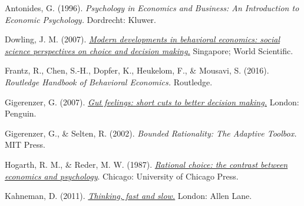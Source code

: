 \documentclass[
  x11names]{article}
\begin{document}
\noindent \vspace{-2em} \setlength{\parindent}{-0.5in}
\setlength{\leftskip}{0.5in} \setlength{\parskip}{7.5pt}

Antonides, G. (1996). \emph{Psychology in Economics and Business: An
Introduction to Economic Psychology.} Dordrecht: Kluwer.

Dowling, J. M. (2007).
\href{https://uol.primo.exlibrisgroup.com/discovery/fulldisplay?docid=alma991001565039703496&context=L&vid=353UOL_INST:353UOL_VU1&lang=en&search_scope=MyInst_and_CI&adaptor=Local\%20Search\%20Engine&tab=TAB1&query=any,contains,Modern\%20developments\%20in\%20behavioral\%20economics:\%20social\%20science\%20perspectives\%20on\%20choice\%20and\%20decision\%20making&sortby=rank&offset=0}{\color{blue}\emph{Modern
developments in behavioral economics: social science perspectives on
choice and decision making.}\color{black}} Singapore; World Scientific.

Frantz, R., Chen, S.-H., Dopfer, K., Heukelom, F., \& Mousavi, S.
(2016). \emph{Routledge Handbook of Behavioral Economics.} Routledge.

Gigerenzer, G. (2007).
\href{https://uol.primo.exlibrisgroup.com/discovery/fulldisplay?docid=alma991001060349703496&context=L&vid=353UOL_INST:353UOL_VU1&lang=en&search_scope=MyInst_and_CI&adaptor=Local\%20Search\%20Engine&tab=TAB1&query=any,contains,gut\%20feelings&sortby=rank}{\color{blue}\emph{Gut
feelings: short cuts to better decision making.}\color{black}} London:
Penguin.

Gigerenzer, G., \& Selten, R. (2002). \emph{Bounded Rationality: The
Adaptive Toolbox.} MIT Press.

Hogarth, R. M., \& Reder, M. W. (1987).
\href{https://uol.primo.exlibrisgroup.com/discovery/fulldisplay?docid=alma991003403189703496&context=L&vid=353UOL_INST:353UOL_VU1&lang=en&search_scope=MyInst_and_CI&adaptor=Local\%20Search\%20Engine&tab=TAB1&query=any,contains,Rational\%20Choice:\%20The\%20Contrast\%20between\%20Economics\%20and\%20Psychology&sortby=rank}{\color{blue}\emph{Rational
choice: the contrast between economics and psychology}\color{black}}.
Chicago: University of Chicago Press.

Kahneman, D. (2011).
\href{https://uol.primo.exlibrisgroup.com/discovery/fulldisplay?docid=alma991001624339703496&context=L&vid=353UOL_INST:353UOL_VU1&lang=en&search_scope=MyInst_and_CI&adaptor=Local\%20Search\%20Engine&tab=TAB1&query=any,contains,Thinking,\%20fast\%20and\%20slow.&sortby=rank&offset=0}{\color{blue}\emph{Thinking,
fast and slow.}\color{black}} London: Allen Lane.
\end{document}
